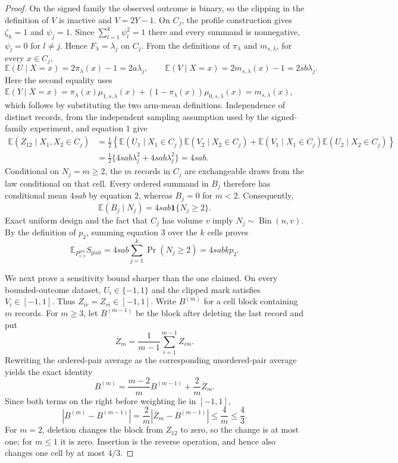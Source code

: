 \documentclass{article}
\begin{document}
\begin{proof}
On the signed family the observed outcome is binary, so the clipping in the definition of \(V\) is inactive and \(V=2Y-1\).  On \(C_j\), the profile construction gives \(\zeta_h=1\) and \(\psi_j=1\).  Since \(\sum_{l=1}^k\psi_l^2=1\) there and every summand is nonnegative, \(\psi_l=0\) for \(l\ne j\).  Hence \(F_\lambda=\lambda_j\) on \(C_j\).  From the definitions of \(\pi_\lambda\) and \(m_{s,\lambda}\), for every \(x\in C_j\),
\[
 \mathbb E(U\mid X=x)=2\pi_\lambda(x)-1=2a\lambda_j,
 \qquad
 \mathbb E(V\mid X=x)=2m_{s,\lambda}(x)-1=2sb\lambda_j. \tag{1}
\]
Here the second equality uses
\(\mathbb E(Y\mid X=x)=\pi_\lambda(x)\mu_{1,s,\lambda}(x)+(1-\pi_\lambda(x))\mu_{0,s,\lambda}(x)=m_{s,\lambda}(x)\), which follows by substituting the two arm-mean definitions.  Independence of distinct records, from the independent sampling assumption used by the signed-family experiment, and equation \(1\) give
\[
 \begin{aligned}
 \mathbb E(Z_{12}\mid X_1,X_2\in C_j)
 &=\frac12\left\{
       \mathbb E(U_1\mid X_1\in C_j)\mathbb E(V_2\mid X_2\in C_j)
      +\mathbb E(V_1\mid X_1\in C_j)\mathbb E(U_2\mid X_2\in C_j)
     \right\}\\
 &=\frac12\{4sab\lambda_j^2+4sab\lambda_j^2\}=4sab. \tag{2}
 \end{aligned}
\]
Conditional on \(N_j=m\ge2\), the \(m\) records in \(C_j\) are exchangeable draws from the law conditional on that cell.  Every ordered summand in \(B_j\) therefore has conditional mean \(4sab\) by equation \(2\), whereas \(B_j=0\) for \(m<2\).  Consequently,
\[
 \mathbb E(B_j\mid N_j)=4sab\mathbf 1\{N_j\ge2\}. \tag{3}
\]
Exact uniform design and the fact that \(C_j\) has volume \(v\) imply \(N_j\sim\operatorname{Bin}(n,v)\).  By the definition of \(p_2\), summing equation \(3\) over the \(k\) cells proves
\[
 \mathbb E_{P_{s,\lambda}^{\otimes n}}S_{\mathrm{pair}}
 =4sab\sum_{j=1}^k\Pr(N_j\ge2)=4sabkp_2. \tag{4}
\]

We next prove a sensitivity bound sharper than the one claimed.  On every bounded-outcome dataset, \(U_i\in\{-1,1\}\) and the clipped mark satisfies \(V_i\in[-1,1]\).  Thus \(Z_{ir}=Z_{ri}\in[-1,1]\).  Write \(B^{(m)}\) for a cell block containing \(m\) records.  For \(m\ge3\), let \(B^{(m-1)}\) be the block after deleting the last record and put
\[
 \overline Z_m=\frac1{m-1}\sum_{i=1}^{m-1}Z_{im}.
\]
Rewriting the ordered-pair average as the corresponding unordered-pair average yields the exact identity
\[
 B^{(m)}=\frac{m-2}{m}B^{(m-1)}+\frac2m\overline Z_m.
\]
Since both terms on the right before weighting lie in \([-1,1]\),
\[
 |B^{(m)}-B^{(m-1)}|
 =\frac2m|\overline Z_m-B^{(m-1)}|
 \le\frac4m\le\frac43. \tag{5}
\]
For \(m=2\), deletion changes the block from \(Z_{12}\) to zero, so the change is at most one; for \(m\le1\) it is zero.  Insertion is the reverse operation, and hence also changes one cell by at most \(4/3\).


\end{proof}
\end{document}
